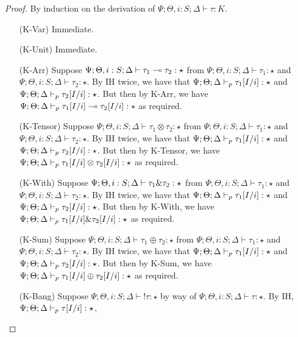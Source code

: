\begin{proof}
By induction on the derivation of $\Psi ; \Theta, i : S ; \Delta \vdash \tau : K$.
\begin{enumerate}
  \item[(K-Var)] Immediate.
  \item[(K-Unit)] Immediate.
  \item[(K-Arr)] Suppose $\Psi ; \Theta, i : S ; \Delta \vdash \tau_1 \multimap \tau_2 : \star$ from
  $\Psi ; \Theta, i : S ; \Delta \vdash \tau_1 : \star$ and
  $\Psi ; \Theta, i : S ; \Delta \vdash \tau_2 : \star$.
  By IH twice, we have that
  $\Psi ; \Theta ; \Delta \vdash_p \tau_1[I/i] : \star$ and
  $\Psi ; \Theta ; \Delta \vdash_p \tau_2[I/i] : \star$.
  But then by K-Arr, we have
  $\Psi ; \Theta ; \Delta \vdash_p \tau_1[I/i] \multimap \tau_2[I/i]: \star$
  as required.
  \item[(K-Tensor)] Suppose $\Psi ; \Theta, i : S ; \Delta \vdash \tau_1 \otimes \tau_2 : \star$ from
  $\Psi ; \Theta, i : S ; \Delta \vdash \tau_1 : \star$ and
  $\Psi ; \Theta, i : S ; \Delta \vdash \tau_2 : \star$.
  By IH twice, we have that
  $\Psi ; \Theta ; \Delta \vdash_p \tau_1[I/i] : \star$ and
  $\Psi ; \Theta ; \Delta \vdash_p \tau_2[I/i] : \star$.
  But then by K-Tensor, we have
  $\Psi ; \Theta ; \Delta \vdash_p \tau_1[I/i] \otimes \tau_2[I/i]: \star$
  as required.
  \item[(K-With)] Suppose $\Psi ; \Theta, i : S ; \Delta \vdash \tau_1 \& \tau_2 : \star$ from
  $\Psi ; \Theta, i : S ; \Delta \vdash \tau_1 : \star$ and
  $\Psi ; \Theta, i : S ; \Delta \vdash \tau_2 : \star$.
  By IH twice, we have that
  $\Psi ; \Theta ; \Delta \vdash_p \tau_1[I/i] : \star$ and
  $\Psi ; \Theta ; \Delta \vdash_p \tau_2[I/i] : \star$.
  But then by K-With, we have
  $\Psi ; \Theta ; \Delta \vdash_p \tau_1[I/i] \& \tau_2[I/i]: \star$
  as required.
  \item[(K-Sum)] Suppose $\Psi ; \Theta, i : S ; \Delta \vdash \tau_1 \oplus \tau_2 : \star$ from
  $\Psi ; \Theta, i : S ; \Delta \vdash \tau_1 : \star$ and
  $\Psi ; \Theta, i : S ; \Delta \vdash \tau_2 : \star$.
  By IH twice, we have that
  $\Psi ; \Theta ; \Delta \vdash_p \tau_1[I/i] : \star$ and
  $\Psi ; \Theta ; \Delta \vdash_p \tau_2[I/i] : \star$.
  But then by K-Sum, we have
  $\Psi ; \Theta ; \Delta \vdash_p \tau_1[I/i] \oplus \tau_2[I/i]: \star$
  as required.
  \item[(K-Bang)] Suppose $\Psi ; \Theta, i : S ; \Delta \vdash !\tau : \star$ by way of
  $\Psi ; \Theta, i : S ; \Delta \vdash \tau : \star$.
  By IH,
  $\Psi ; \Theta ; \Delta \vdash_p \tau[I/i] : \star$,

\end{enumerate}
\end{proof}
